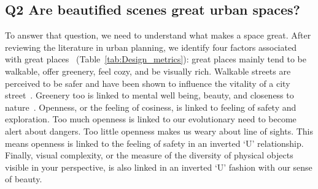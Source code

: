 \subsection{Q2 Are beautified scenes great urban spaces?}
To answer that question, we need to understand what makes a space great. After reviewing the literature in urban planning, we identify four factors associated with  great places~\cite{ewing2013measuring,alexander1977pattern,jacobs1961death} (Table~\ref{tab:Design_metrics}): great places mainly tend to be walkable, offer greenery, feel cozy, and be visually rich. Walkable streets are perceived to be safer and have been shown to influence the vitality of a city street~\cite{jacobs1961death}. Greenery too is linked to mental well being, beauty, and closeness to nature~\cite{alexander1977pattern}. Openness, or the feeling of cosiness, is linked to feeling of safety and exploration. Too much openness is linked to our evolutionary need to become alert about dangers. Too little openness makes us weary about line of sights. This means openness is linked to the feeling of safety in an inverted `U' relationship. Finally, visual complexity, or the measure of the diversity of physical objects visible in your perspective, is also linked in an inverted `U' fashion with our sense of beauty. 

